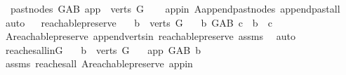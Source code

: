 \begin{isabellebody}
\ \ {\isachardoublequoteopen}past{\isacharunderscore}{\kern0pt}nodes\ G{\isacharunderscore}{\kern0pt}AB\ app\ {\isacharequal}{\kern0pt}\ verts\ G{\isachardoublequoteclose}\isanewline
%
\isadelimproof
\ \ %
\endisadelimproof
%
\isatagproof
{}\isamarkupfalse%
\ app{\isacharunderscore}{\kern0pt}in\ A{}{\isachardot}{\kern0pt}append{\isacharunderscore}{\kern0pt}past{\isacharunderscore}{\kern0pt}nodes\ append{\isacharunderscore}{\kern0pt}past{\isacharunderscore}{\kern0pt}all\isanewline
\ \ \isamarkupfalse%
\ auto%
\endisatagproof
{\isafoldproof}%
%
\isadelimproof
\ \isanewline
%
\endisadelimproof
\isanewline
\isanewline
{}\isamarkupfalse%
\ reachable{}{\isacharunderscore}{\kern0pt}preserve{}{\isacharcolon}{\kern0pt}\isanewline
\ \ \ {\isachardoublequoteopen}b\ {\isasymin}\ verts\ G{\isachardoublequoteclose}\isanewline
\ \ \ {\isachardoublequoteopen}{\isacharparenleft}{\kern0pt}b\ {\isasymrightarrow}\isactrlsup {\isacharplus}{\kern0pt}\isactrlbsub G{\isacharunderscore}{\kern0pt}AB\isactrlesub \ c{\isacharparenright}{\kern0pt}\ {\isasymlongleftrightarrow}\ b\ {\isasymrightarrow}\isactrlsup {\isacharplus}{\kern0pt}\ c{\isachardoublequoteclose}\isanewline
%
\isadelimproof
\ \ %
\endisadelimproof
%
\isatagproof
{}\isamarkupfalse%
\ A{}{\isachardot}{\kern0pt}reachable{}{\isacharunderscore}{\kern0pt}preserve\ append{\isacharunderscore}{\kern0pt}verts{\isacharunderscore}{\kern0pt}in\ reachable{}{\isacharunderscore}{\kern0pt}preserve\ assms\ \isamarkupfalse%
\ auto%
\endisatagproof
{\isafoldproof}%
%
\isadelimproof
\isanewline
%
\endisadelimproof
\isanewline
{}\isamarkupfalse%
\ reaches{\isacharunderscore}{\kern0pt}all{\isacharunderscore}{\kern0pt}in{\isacharunderscore}{\kern0pt}G{\isacharcolon}{\kern0pt}\isanewline
\ \ \ {\isachardoublequoteopen}b\ {\isasymin}\ verts\ G{\isachardoublequoteclose}\isanewline
\ \ \ {\isachardoublequoteopen}app\ {\isasymrightarrow}\isactrlsup {\isacharplus}{\kern0pt}\isactrlbsub G{\isacharunderscore}{\kern0pt}AB\isactrlesub \ b{\isachardoublequoteclose}\isanewline
%
\isadelimproof
\ \ %
\endisadelimproof
%
\isatagproof
{}\isamarkupfalse%
\ assms{\isacharparenleft}{\kern0pt}{}{\isacharparenright}{\kern0pt}\ reaches{\isacharunderscore}{\kern0pt}all\ A{}{\isachardot}{\kern0pt}reachable{}{\isacharunderscore}{\kern0pt}preserve\ app{\isacharunderscore}{\kern0pt}in\isanewline

\end{isabellebody}
